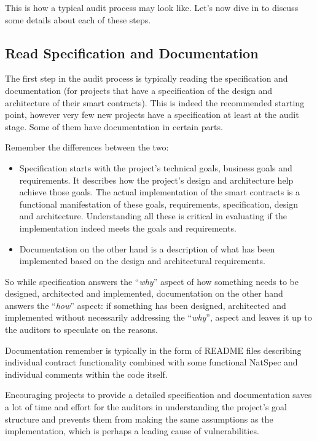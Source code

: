 This is how a typical audit process may look like. Let's now dive in to
discuss some details about each of these steps.

\subsection{Read Specification and
Documentation}\label{read-specification-and-documentation}

The first step in the audit process is typically reading the
specification and documentation (for projects that have a specification
of the design and architecture of their smart contracts). This is indeed
the recommended starting point, however very few new projects have a
specification at least at the audit stage. Some of them have
documentation in certain parts.

Remember the differences between the two:

\begin{itemize}
\item
  Specification starts with the project's technical goals, business
  goals and requirements. It describes how the project's design and
  architecture help achieve those goals. The actual implementation of
  the smart contracts is a functional manifestation of these goals,
  requirements, specification, design and architecture. Understanding
  all these is critical in evaluating if the implementation indeed meets
  the goals and requirements.
\item
  Documentation on the other hand is a description of what has been
  implemented based on the design and architectural requirements.
\end{itemize}

So while specification answers the ``\emph{why}'' aspect of how
something needs to be designed, architected and implemented,
documentation on the other hand answers the ``\emph{how}'' aspect: if
something has been designed, architected and implemented without
necessarily addressing the ``\emph{why}'', aspect and leaves it up to
the auditors to speculate on the reasons.

Documentation remember is typically in the form of README files
describing individual contract functionality combined with some
functional NatSpec and individual comments within the code itself.

Encouraging projects to provide a detailed specification and
documentation saves a lot of time and effort for the auditors in
understanding the project's goal structure and prevents them from making
the same assumptions as the implementation, which is perhaps a leading
cause of vulnerabilities.

